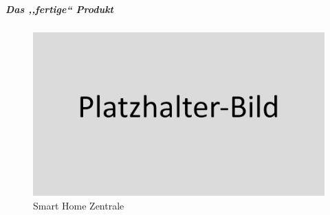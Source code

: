 \subparagraph{Das ,,fertige`` Produkt}
\begin{figure}[h!t]
	\includegraphics[width=1\textwidth]{img/placeholder.png}
	\caption[Smart Home Zentrale]{Smart Home Zentrale}
	\label{fig:smart-home-zentrale}
\end{figure}